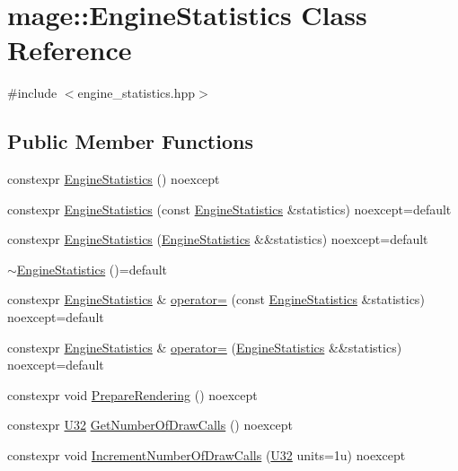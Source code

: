 \hypertarget{classmage_1_1_engine_statistics}{}\section{mage\+:\+:Engine\+Statistics Class Reference}
\label{classmage_1_1_engine_statistics}


{\ttfamily \#include $<$engine\+\_\+statistics.\+hpp$>$}

\subsection*{Public Member Functions}
\begin{DoxyCompactItemize}
\item 
constexpr \hyperlink{classmage_1_1_engine_statistics_a0f0d19fdbdf37d28feb2885c0cc2b6a0}{Engine\+Statistics} () noexcept
\item 
constexpr \hyperlink{classmage_1_1_engine_statistics_a31a2068d0346392755e431afed37f8f5}{Engine\+Statistics} (const \hyperlink{classmage_1_1_engine_statistics}{Engine\+Statistics} \&statistics) noexcept=default
\item 
constexpr \hyperlink{classmage_1_1_engine_statistics_ac050f7bfeea2cc8e59f771073fc3ee4c}{Engine\+Statistics} (\hyperlink{classmage_1_1_engine_statistics}{Engine\+Statistics} \&\&statistics) noexcept=default
\item 
\hyperlink{classmage_1_1_engine_statistics_a471f643061b881ae69cc807b34c48127}{$\sim$\+Engine\+Statistics} ()=default
\item 
constexpr \hyperlink{classmage_1_1_engine_statistics}{Engine\+Statistics} \& \hyperlink{classmage_1_1_engine_statistics_a98d201b7ecde677733d19a128cf7bdc6}{operator=} (const \hyperlink{classmage_1_1_engine_statistics}{Engine\+Statistics} \&statistics) noexcept=default
\item 
constexpr \hyperlink{classmage_1_1_engine_statistics}{Engine\+Statistics} \& \hyperlink{classmage_1_1_engine_statistics_acde0bf9a215610270cca376a615d083e}{operator=} (\hyperlink{classmage_1_1_engine_statistics}{Engine\+Statistics} \&\&statistics) noexcept=default
\item 
constexpr void \hyperlink{classmage_1_1_engine_statistics_a15eaca9bc77798a83e9c1a51fe6c7933}{Prepare\+Rendering} () noexcept
\item 
constexpr \hyperlink{namespacemage_a41c104c036fba3756a74e19f793eeaa1}{U32} \hyperlink{classmage_1_1_engine_statistics_a8c9a6691cec0c6544c4fb2e426ab4379}{Get\+Number\+Of\+Draw\+Calls} () noexcept
\item 
constexpr void \hyperlink{classmage_1_1_engine_statistics_a3618f9d29278557fb86cb5f6bb159113}{Increment\+Number\+Of\+Draw\+Calls} (\hyperlink{namespacemage_a41c104c036fba3756a74e19f793eeaa1}{U32} units=1u) noexcept
\end{DoxyCompactItemize}
